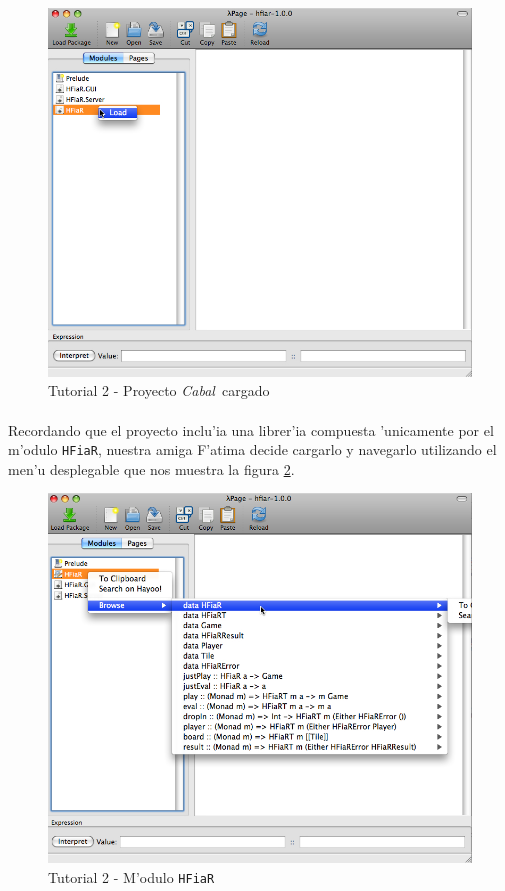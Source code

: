\documentclass[a4paper]{article}
\newcommand{\cabal}{\textsl{Cabal}}
\begin{document}
\begin{figure}[hp]
	\begin{center}
        	\includegraphics[width=.9\textwidth]{pictures/tut2/03}
		\caption{Tutorial 2 - Proyecto \cabal\ cargado}
		\label{tut203}
	\end{center}
\end{figure}
\newpage
\paragraph{}Recordando que el proyecto inclu'ia una librer'ia compuesta 'unicamente por el m'odulo \texttt{HFiaR}, nuestra amiga F'atima decide cargarlo y navegarlo utilizando el men'u desplegable que nos muestra la figura \ref{tut204}.
\begin{figure}[hp]
	\begin{center}
        	\includegraphics[width=.9\textwidth]{pictures/tut2/04}
		\caption{Tutorial 2 - M'odulo \texttt{HFiaR}}
		\label{tut204}
	\end{center}
\end{figure}
\end{document}
